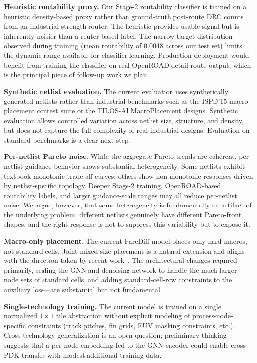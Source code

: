 \documentclass[lettersize,journal]{IEEEtran}
\begin{document}
\textbf{Heuristic routability proxy.} Our Stage-2 routability classifier is trained on a heuristic density-based proxy rather than ground-truth post-route DRC counts from an industrial-strength router. The heuristic provides usable signal but is inherently noisier than a router-based label. The narrow target distribution observed during training (mean routability of 0.0048 across our test set) limits the dynamic range available for classifier learning. Production deployment would benefit from training the classifier on real OpenROAD detail-route output, which is the principal piece of follow-up work we plan.

\textbf{Synthetic netlist evaluation.} The current evaluation uses synthetically generated netlists rather than industrial benchmarks such as the ISPD'15 macro placement contest suite or the TILOS-AI MacroPlacement designs. Synthetic evaluation allows controlled variation across netlist size, structure, and density, but does not capture the full complexity of real industrial designs. Evaluation on standard benchmarks is a clear next step.

\textbf{Per-netlist Pareto noise.} While the aggregate Pareto trends are coherent, per-netlist guidance behavior shows substantial heterogeneity. Some netlists exhibit textbook monotonic trade-off curves; others show non-monotonic responses driven by netlist-specific topology. Deeper Stage-2 training, OpenROAD-based routability labels, and larger guidance-scale ranges may all reduce per-netlist noise. We argue, however, that some heterogeneity is fundamentally an artifact of the underlying problem: different netlists genuinely have different Pareto-front shapes, and the right response is not to suppress this variability but to expose it.

\textbf{Macro-only placement.} The current PareDiff model places only hard macros, not standard cells. Joint mixed-size placement is a natural extension and aligns with the direction taken by recent work~\cite{trung2025diffplace}. The architectural changes required---primarily, scaling the GNN and denoising network to handle the much larger node sets of standard cells, and adding standard-cell-row constraints to the auxiliary loss---are substantial but not fundamental.

\textbf{Single-technology training.} The current model is trained on a single normalized $1 \times 1$ tile abstraction without explicit modeling of process-node-specific constraints (track pitches, fin grids, EUV masking constraints, etc.). Cross-technology generalization is an open question; preliminary thinking suggests that a per-node embedding fed to the GNN encoder could enable cross-PDK transfer with modest additional training data.
\end{document}
